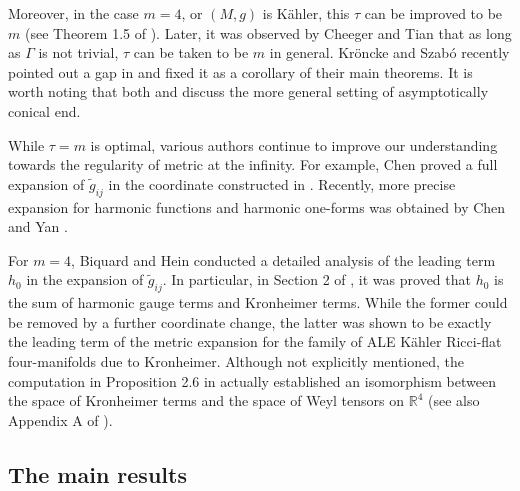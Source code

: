 \documentclass{amsart}
\newcommand{\Real}{\mathbb R}
\numberwithin{equation}{section}
\begin{document}
Moreover, in the case $m=4$, or $(M,g)$ is K\"ahler, this $\tau$ can be improved to be $m$ (see Theorem 1.5 of \cite{bando1989on}). Later, it was observed by Cheeger and Tian \cite{cheeger1994} that as long as $\Gamma$ is not trivial, $\tau$ can be taken to be $m$ in general. Kr\"oncke and Szab\'o recently \cite{kroencke2022optimal} pointed out a gap in \cite{cheeger1994} and fixed it as a corollary of their main theorems. It is worth noting that both \cite{cheeger1994} and \cite{kroencke2022optimal} discuss the more general setting of asymptotically conical end.


While $\tau=m$ is optimal, various authors continue to improve our understanding towards the regularity of metric at the infinity. For example, Chen \cite{chen2020expansion} proved a full expansion of $\tilde{g}_{ij}$ in the coordinate constructed in \cite{bando1989on}. Recently, more precise expansion for harmonic functions and harmonic one-forms was obtained by Chen and Yan \cite{chen2025harmonicformsalericciflat}.

For $m=4$, Biquard and Hein conducted a detailed analysis of the leading term $h_0$ in the expansion of $\tilde{g}_{ij}$. In particular, in Section 2 of \cite{biquard2023renormalized}, it was proved that $h_0$ is the sum of harmonic gauge terms and Kronheimer terms. While the former could be removed by a further coordinate change, the latter was shown to be exactly the leading term of the metric expansion for the family of ALE K\"ahler Ricci-flat four-manifolds due to Kronheimer. Although not explicitly mentioned, the computation in Proposition 2.6 in \cite{biquard2023renormalized} actually established an isomorphism between the space of Kronheimer terms and the space of Weyl tensors on $\Real^4$ (see also Appendix A of \cite{ozuch2024}). 


\subsection{The main results}
\end{document}
